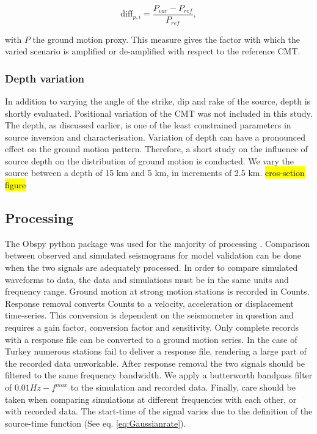 \documentclass[../Text/00main.tex]{subfiles}
\begin{document}
\begin{equation}
    \text{diff}_{p,i} = \frac{P_{var} - P_{ref}}{P_{ref}},
\end{equation}

with $P$ the ground motion proxy. This measure gives the factor with which the varied scenario is amplified or de-amplified with respect to the reference CMT.

\subsubsection{Depth variation}

In addition to varying the angle of the strike, dip and rake of the source, depth is shortly evaluated. Positional variation of the CMT was not included in this study. The depth, as discussed earlier, is one of the least constrained parameters in source inversion and characterisation. Variation of depth can have a pronounced effect on the ground motion pattern. Therefore, a short study on the influence of source depth on the distribution of ground motion is conducted. We vary the source between a depth of 15 km and 5 km, in increments of 2.5 km. \hl{cros-setion figure}

\subsection{Processing}

The Obspy python package was used for the majority of processing \citep{hosseini_obspydmt_2017}. Comparison between observed and simulated seismograms for model validation can be done when the two signals are adequately processed. In order to compare simulated waveforms to data, the data and simulations must be in the same units and frequency range. Ground motion at strong motion stations is recorded in Counts. Response removal converts Counts to a velocity, acceleration or displacement time-series. This conversion is dependent on the seismometer in question and requires a gain factor, conversion factor and sensitivity. Only complete records with a response file can be converted to a ground motion series. In the case of Turkey numerous stations fail to deliver a response file, rendering a large part of the recorded data unworkable. After response removal the two signals should be filtered to the same frequency bandwidth. We apply a butterworth bandpass filter of $0.01 Hz - f^{max}$ to the simulation and recorded data. Finally, care should be taken when comparing simulations at different frequencies with each other, or with recorded data. The start-time of the signal varies due to the definition of the source-time function (See eq. \ref{eq:Gaussianrate}). 
\end{document}
